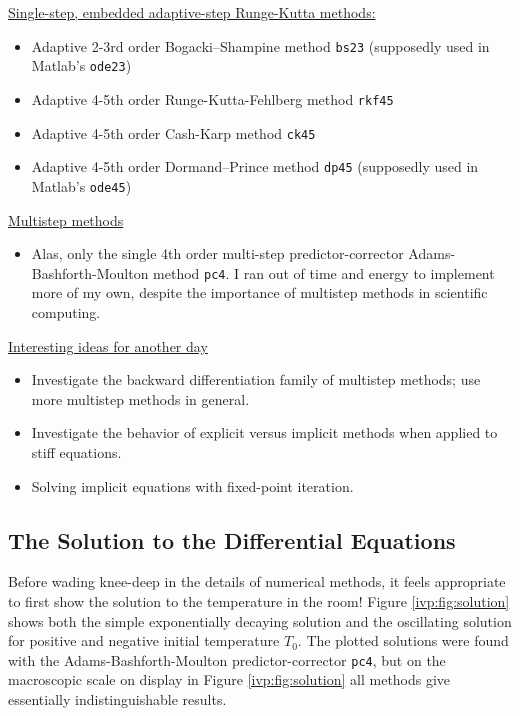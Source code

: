 \documentclass[11pt, a4paper]{article}
\begin{document}
\vspace{2mm}
\underline{Single-step, embedded adaptive-step Runge-Kutta methods:}
\begin{itemize}
	\item Adaptive 2-3rd order Bogacki–Shampine method \texttt{bs23} (supposedly used in Matlab's \texttt{ode23})
	
	\item Adaptive 4-5th order Runge-Kutta-Fehlberg method \texttt{rkf45}
	
	\item Adaptive 4-5th order Cash-Karp method \texttt{ck45}

	\item Adaptive 4-5th order Dormand–Prince method \texttt{dp45} (supposedly used in Matlab's \texttt{ode45})
\end{itemize}

\vspace{2mm}
\underline{Multistep methods}
\begin{itemize}
	\item Alas, only the single 4th order multi-step predictor-corrector Adams-Bashforth-Moulton method \texttt{pc4}. I ran out of time and energy to implement more of my own, despite the importance of multistep methods in scientific computing.
\end{itemize}

\vspace{2mm}
\underline{Interesting ideas for another day}
\begin{itemize}
	\item Investigate the backward differentiation family of multistep methods; use more multistep methods in general.
	\item Investigate the behavior of explicit versus implicit methods when applied to stiff equations.
	\item Solving implicit equations with fixed-point iteration.
\end{itemize}


\subsection{The Solution to the Differential Equations}
Before wading knee-deep in the details of numerical methods, it feels appropriate to first show the solution to the temperature in the room! Figure \ref{ivp:fig:solution} shows both the simple exponentially decaying solution and the oscillating solution for positive and negative initial temperature $ T_{0} $. The plotted solutions were found with the Adams-Bashforth-Moulton predictor-corrector \texttt{pc4}, but on the macroscopic scale on display in Figure \ref{ivp:fig:solution} all methods give essentially indistinguishable results. 
\end{document}
